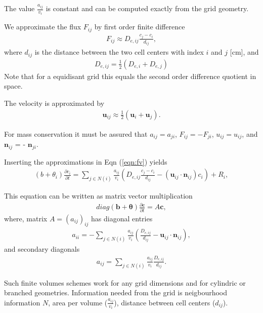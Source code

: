 \documentclass[a4paper,10pt]{article}
\begin{document}
The value $\frac{a_{ij}}{v_i}$ is constant and can be computed exactly from the grid geometry. 

We approximate the flux $F_{ij}$ by first order finite difference
\begin{eqnarray}
F_{ij}  \approx D_{e,ij} \frac{c_j - c_i} {d_{ij}},   
\end{eqnarray}
where $d_{ij}$ is the distance between the two cell centers with index $i$ and $j$ [cm], and
\begin{eqnarray}
D_{e,ij} = \frac12 (D_{e,i} + D_{e,j})
\end{eqnarray}
Note that for a equidisant grid this equals the second order difference quotient in space. 

The velocity is approximated by
\begin{eqnarray}
\mathbf{u}_{ij} \approx \frac12 (\mathbf{u}_i + \mathbf{u}_j).  
\end{eqnarray}

For mass conservation it must be assured that $a_{ij} = a_{ji}$,  $F_{ij} = -F_{ji}$,  $u_{ij}= u_{ij}$, and $\mathbf{n}_{ij}$ = - $\mathbf{n}_{ji}$.

Inserting the approximations in Eqn (\ref{eqn:fv}) yields
\begin{eqnarray}
 (b+\theta_i) \frac{\partial c_i}{\partial t}  =\sum_{j \in N(i)}  \frac{a_{ij}}{v_i} \left( D_{e,ij} \frac{c_j - c_i} {d_{ij}} - (\mathbf{u}_{ij}\cdot \mathbf{n}_{ij}) c_i \right) + R_i,  \label{eqn:fv2}
\end{eqnarray}

This equation can be written as matrix vector multiplication
\begin{eqnarray}
 diag(\mathbf{b}+\mathbf{\theta}) \frac{\partial \mathbf{c}}{\partial t}  = A \mathbf{c},  \label{eqn:matrix} \label{eq:ode}
\end{eqnarray}
where, matrix $A=(a_{ij})_{ij}$ has diagonal entries
\begin{eqnarray}
a_{ii} = -\sum_{j \in N(i)}  \frac{a_{ij}}{v_i} (\frac{D_{e,ij}}{d_{ij}} - \mathbf{u}_{ij}\cdot \mathbf{n}_{ij} ),
\end{eqnarray}
and secondary diagonals
\begin{eqnarray}
a_{ij} = \sum_{j \in N(i)} \frac{a_{ij}}{v_i} \frac{D_{e,ij}}{d_{ij}}.
\end{eqnarray}

Such finite volumes schemes work for any grid dimensions and for cylindric or branched geometries. Information needed from the grid is neigbourhood information $N$, area per volume ($\frac{a_{ij}}{v_i}$), distance between cell centers ($d_{ij}$).
\end{document}
